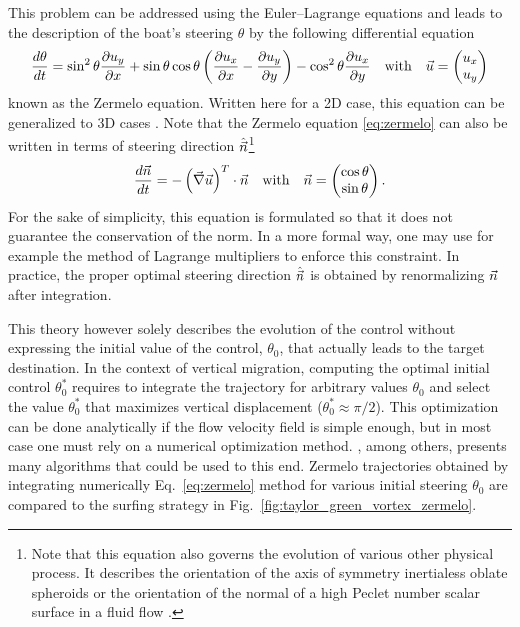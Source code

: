This problem can be addressed using the Euler–Lagrange equations and leads to the description of the boat's steering $\theta$ by the following differential equation
\begin{equation}
	\label{eq:zermelo}
	\frac{d \theta}{d t} 
	= \sin^2\theta \frac{\partial u_y}{\partial x} 
	+ \sin\theta \cos\theta \left(\frac{\partial u_x}{\partial x} - \frac{\partial u_y}{\partial y}
	\right) - \cos^2\theta\frac{\partial u_x}{\partial y}
	\quad \text{with} \quad \vec{u} = \begin{pmatrix}
		u_x \\
		u_y
	\end{pmatrix}
\end{equation}
known as the Zermelo equation.
Written here for a 2D case, this equation can be generalized to 3D cases \citep{guerrero2013uav}.
Note that the Zermelo equation \eqref{eq:zermelo} can also be written in terms of steering direction $\hat{\vec{n}}$\footnote{Note that this equation also governs the evolution of various other physical process. It describes the orientation of the axis of symmetry inertialess oblate spheroids \citep{jeffery_motion_1922} or the orientation of the normal of a high Peclet number scalar surface in a fluid flow \citep{martinez2018diffusive}.}
\begin{equation}
	\label{eq:zermelo_p}
	\frac{d \vec{n}}{d t}
	= -\left( \vec{\nabla} \vec{u} \right)^T \cdot \vec{n} \quad \text{with} \quad \vec{n} = \begin{pmatrix}
		\cos \theta \\
		\sin \theta
	\end{pmatrix}.
\end{equation}
For the sake of simplicity, this equation is formulated so that it does not guarantee the conservation of the norm.
In a more formal way, one may use for example the method of Lagrange multipliers to enforce this constraint.
In practice, the proper optimal steering direction $\hat{\vec{n}}$ is obtained by renormalizing $\vec{n}$ after integration.

This theory however solely describes the evolution of the control without expressing the initial value of the control, $\theta_0$, that actually leads to the target destination.
In the context of vertical migration, computing the optimal initial control $\theta_0^*$ requires to integrate the trajectory for arbitrary values $\theta_0$ and select the value $\theta_0^*$ that maximizes vertical displacement ($\theta_0^* \approx \pi/2$).
This optimization can be done analytically if the flow velocity field is simple enough, but in most case one must rely on a numerical optimization method.
\citet{brownlee2011clever}, among others, presents many algorithms that could be used to this end.
Zermelo trajectories obtained by integrating numerically Eq.~\eqref{eq:zermelo} method for various initial steering $\theta_0$ are compared to the surfing strategy in Fig.~\ref{fig:taylor_green_vortex_zermelo}.

